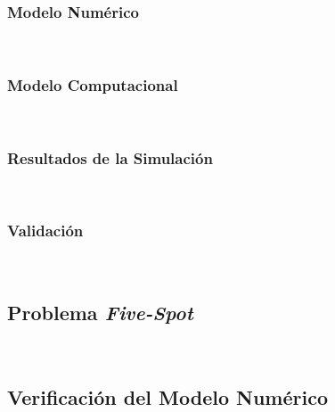 \subsubsection{Modelo Numérico}~\hypertarget{sec:sec3523}{}
\label{sec:sec3523}


\subsubsection{Modelo Computacional}~\hypertarget{sec:sec3524}{}
\label{sec:sec3524}


\subsubsection{Resultados de la Simulación}~\hypertarget{sec:sec3525}{}
\label{sec:sec3525}


\subsubsection{Validación}~\hypertarget{sec:sec3526}{}
\label{sec:sec3526}



\subsection{Problema \textit{Five-Spot}}~\hypertarget{sec:sec353}{}
\label{sec:sec353}


\subsection{Verificación del Modelo Numérico}~\hypertarget{sec:sec354}{}
\label{sec:sec354}

